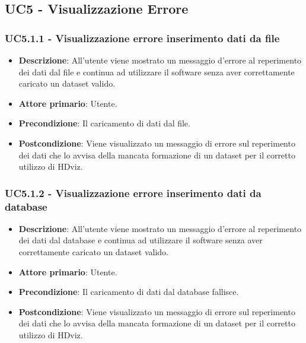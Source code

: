 \newpage
\subsection{UC5 - Visualizzazione Errore}
\label{subsec:uc5}


\subsubsection{UC5.1.1 - Visualizzazione errore inserimento dati da file}
\label{subsec:uc5.1.1}
\begin{itemize}
    \item \textbf{Descrizione}: All'utente viene mostrato un messaggio d'errore al reperimento
                                dei dati dal file e continua ad utilizzare 
                                il software senza aver correttamente caricato un dataset valido.

    \item \textbf{Attore primario}: Utente.
    
    \item \textbf{Precondizione}:   Il caricamento di dati dal file.

    \item \textbf{Postcondizione}:  Viene visualizzato un messaggio di errore sul reperimento dei 
                                    dati che lo avvisa della mancata formazione di un dataset per il
                                    corretto utilizzo di HDviz.

\end{itemize}


\subsubsection{UC5.1.2 - Visualizzazione errore inserimento dati da database}
\label{subsec:uc5.1.2}
\begin{itemize}
    \item \textbf{Descrizione}: All'utente viene mostrato un messaggio d'errore al reperimento
                                dei dati dal database e continua ad utilizzare 
                                il software senza aver correttamente caricato un dataset valido.

    \item \textbf{Attore primario}: Utente.
    
    \item \textbf{Precondizione}:   Il caricamento di dati dal database fallisce.

    \item \textbf{Postcondizione}:  Viene visualizzato un messaggio di errore sul reperimento dei 
                                    dati che lo avvisa della mancata formazione di un dataset per il
                                    corretto utilizzo di HDviz.

\end{itemize}

